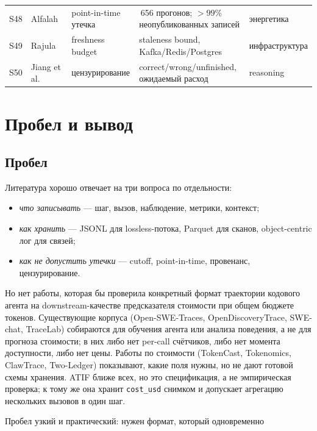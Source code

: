 \documentclass[11pt,a4paper]{article}
\begin{document}
{\begin{longtable}{@{}>{\raggedright\arraybackslash}p{0.55cm}>{\raggedright\arraybackslash}p{3.0cm}>{\raggedright\arraybackslash}p{2.7cm}>{\raggedright\arraybackslash}p{4.3cm}>{\raggedright\arraybackslash}p{3.0cm}@{}}
S48 & Alfalah~\cite{alfalah2026lookahead} & point-in-time утечка & 128\,656 прогонов; $>99\%$ неопубликованных записей & энергетика \\
S49 & Rajula~\cite{rajula2026freshness} & freshness budget & staleness bound, Kafka/Redis/Postgres & инфраструктура \\
S50 & Jiang et al.~\cite{jiang2026crater} & цензурирование & correct/wrong/unfinished, ожидаемый расход & reasoning \\
\end{longtable}
}

\section{Пробел и вывод}

\subsection{Пробел}

Литература хорошо отвечает на три вопроса по отдельности:

\begin{itemize}
  \item \emph{что записывать} — шаг, вызов, наблюдение, метрики, контекст;
  \item \emph{как хранить} — JSONL для lossless-потока, Parquet для сканов,
        object-centric лог для связей;
  \item \emph{как не допустить утечки} — cutoff, point-in-time, провенанс,
        цензурирование.
\end{itemize}

Но нет работы, которая бы проверила конкретный формат траектории кодового
агента на downstream-качестве предсказателя стоимости при общем бюджете
токенов. Существующие корпуса (Open-SWE-Traces, OpenDiscoveryTrace,
SWE-chat, TraceLab) собираются для обучения агента или анализа поведения,
а не для прогноза стоимости; в них либо нет per-call счётчиков, либо нет
момента доступности, либо нет цены. Работы по стоимости (TokenCast,
Tokenomics, ClawTrace, Two-Ledger) показывают, какие поля нужны, но не
дают готовой схемы хранения. ATIF ближе всех, но это спецификация, а не
эмпирическая проверка; к тому же она хранит \texttt{cost\_usd} снимком и
допускает агрегацию нескольких вызовов в один шаг.

Пробел узкий и практический: нужен формат, который одновременно
\end{document}
